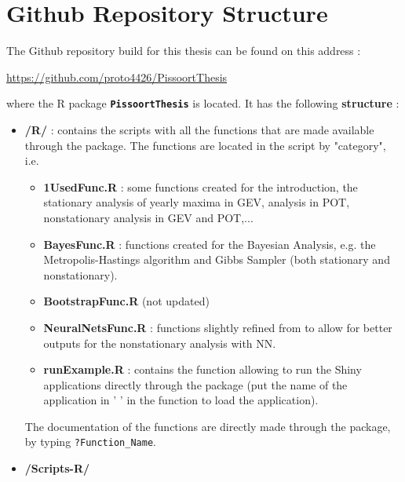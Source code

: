\documentclass[11pt,a4paper,openany ]{book}
\begin{document}
\chapter{Github Repository Structure}\label{appgit}

The Github repository build for this thesis can be found on this address :

\begin{center}
\url{https://github.com/proto4426/PissoortThesis}
\end{center}

where the R package \textbf{\texttt{PissoortThesis}} is located. It has the following \textbf{structure} : 

\begin{itemize}
\item \textbf{/R/} : contains the scripts with all the functions that are made available through the package. The functions are located in the script by "category", i.e. 
\begin{itemize}
\item \textbf{1UsedFunc.R} : some functions created for the introduction, the stationary analysis of yearly maxima in GEV, analysis in POT, nonstationary analysis in GEV and POT,...
\item \textbf{BayesFunc.R} : functions created for the Bayesian Analysis, e.g. the Metropolis-Hastings algorithm and Gibbs Sampler (both stationary and nonstationary).
\item \textbf{BootstrapFunc.R} (not updated)
\item \textbf{NeuralNetsFunc.R} : functions slightly refined from \citet{cannon_flexible_2010} to allow for better outputs for the nonstationary analysis with NN.
\item \textbf{runExample.R} : contains the function allowing to run the Shiny applications directly through the package (put the name of the application in ' ' in the function to load the application). 
\end{itemize} 

The documentation of the functions are directly made through the package, by typing \texttt{?Function\_Name}.
\item \textbf{/Scripts-R/}


\end{itemize}
\end{document}
